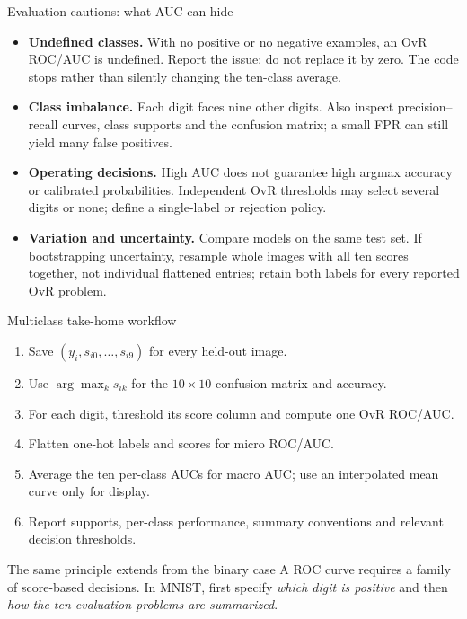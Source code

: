 \documentclass[aspectratio=169,11pt]{beamer}
\begin{document}
\begin{frame}{Evaluation cautions: what AUC can hide}
\begin{itemize}
\item \textbf{Undefined classes.} With no positive or no negative examples,
      an OvR ROC/AUC is undefined. Report the issue; do not replace it by zero.
      The code stops rather than silently changing the ten-class average.
\item \textbf{Class imbalance.} Each digit faces nine other digits.
      Also inspect precision--recall curves, class supports and the confusion
      matrix; a small FPR can still yield many false positives.
\item \textbf{Operating decisions.} High AUC does not guarantee high argmax
      accuracy or calibrated probabilities. Independent OvR thresholds may
      select several digits or none; define a single-label or rejection policy.
\item \textbf{Variation and uncertainty.} Compare models on the same test
      set. If bootstrapping uncertainty, resample whole images with all ten
      scores together, not individual flattened entries; retain both labels
      for every reported OvR problem.
\end{itemize}
\end{frame}

\begin{frame}{Multiclass take-home workflow}
\begin{enumerate}
\item Save $(y_i,s_{i0},\ldots,s_{i9})$ for every held-out image.
\item Use $\arg\max_k s_{ik}$ for the $10\times10$ confusion matrix and accuracy.
\item For each digit, threshold its score column and compute one OvR ROC/AUC.
\item Flatten one-hot labels and scores for micro ROC/AUC.
\item Average the ten per-class AUCs for macro AUC; use an interpolated
      mean curve only for display.
\item Report supports, per-class performance, summary conventions and
      relevant decision thresholds.
\end{enumerate}
\begin{block}{The same principle extends from the binary case}
A ROC curve requires a family of score-based decisions.
In MNIST, first specify \emph{which digit is positive} and then
\emph{how the ten evaluation problems are summarized}.
\end{block}
\end{frame}
\end{document}
